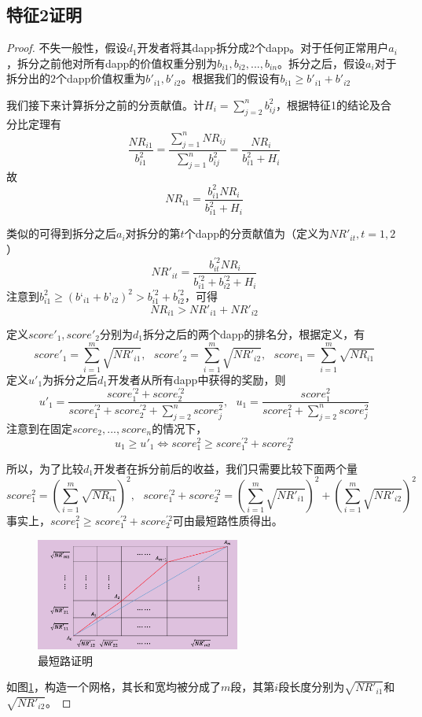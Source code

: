 \subsection{特征2证明}
\begin{proof}
	 不失一般性，假设$d_1$开发者将其dapp拆分成2个dapp。对于任何正常用户$a_i$，拆分之前他对所有dapp的价值权重分别为$b_{i1},b_{i2},...,b_{in}$。拆分之后，假设$a_i$对于拆分出的$2$个dapp价值权重为$b'_{i1},b'_{i2}$。根据我们的假设有$b_{i1} \geq b'_{i1}+b'_{i2}$
	 
	 我们接下来计算拆分之前的分贡献值。计$H_i = \sum_{j=2}^n b_{ij}^2$，根据特征1的结论及合分比定理有
	 $$\frac{NR_{i1}}{b_{i1}^2} = \frac{\sum_{j=1}^n NR_{ij}}{\sum_{j=1}^n b_{ij}^2} = \frac{NR_i}{b_{i1}^2+H_i}$$ 
	 故
	 $$NR_{i1}=\frac{b_{i1}^2NR_i}{b_{i1}^2+H_i}$$
	 
     类似的可得到拆分之后$a_i$对拆分的第$t$个dapp的分贡献值为（定义为$NR'_{it},t=1,2$）
	 $$NR'_{it} =  \frac{b_{it}^{'2}NR_i}{b_{i1}^{'2}+b_{i2}^{'2}+H_i}$$
	 注意到$b_{i1}^2 \geq (b‘_{i1}+b’_{i2})^2 >b_{i1}^{'2}+b_{i2}^{'2}$，可得
	 $$NR_{i1} > NR'_{i1}+NR'_{i2}$$
	 
	 定义$score'_1,score'_2$分别为$d_1$拆分之后的两个dapp的排名分，根据定义，有
	 $$score'_1 =  \sum_{i=1}^m \sqrt{NR'_{i1}},~~~score'_2 =  \sum_{i=1}^m \sqrt{NR'_{i2}},~~~score_1 = \sum_{i=1}^m \sqrt{NR_{i1}}$$
	 定义$u'_1$为拆分之后$d_1$开发者从所有dapp中获得的奖励，则
	 $$u'_1=\frac{score_1^{'2}+score_2^{'2}}{score_1^{'2}+score_2^{'2}+\sum_{j=2}^n score_j^2},~~~u_1=\frac{score^2_1}{score_1^2+\sum_{j=2}^n score_j^2}$$
	 注意到在固定$score_2,...,score_n$的情况下，
	 $$ u_1 \geq u'_1 \Leftrightarrow score_1^2 \geq score_1^{'2}+score_2^{'2}$$
	 
	 所以，为了比较$d_1$开发者在拆分前后的收益，我们只需要比较下面两个量
	 $$score_1^2 = (\sum_{i=1}^m \sqrt{NR_{i1}})^2,~~~score_1^{'2}+score_2^{'2}=  (\sum_{i=1}^m \sqrt{NR'_{i1}})^2+(\sum_{i=1}^m \sqrt{NR'_{i2}})^2$$
	 事实上，$score_1^2 \geq score_1^{'2}+score_2^{'2}$可由最短路性质得出。
	 \begin{figure}
	 	\centering
	 	 \includegraphics[width = 0.6\textwidth]{../common/m1.png}
	 	\caption{最短路证明 \label{fig:path}}
	 \end{figure}
	 如图\ref{fig:path}，构造一个网格，其长和宽均被分成了$m$段，其第$i$段长度分别为$\sqrt{NR'_{i1}}$和$\sqrt{NR'_{i2}}$。
	 

\end{proof}
